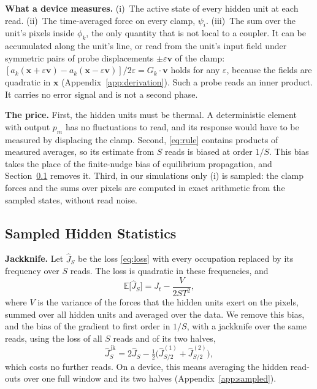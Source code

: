 \documentclass{article}
\newcommand{\x}{\bm{x}}
\begin{document}
\textbf{What a device measures.}
(i)~The active state of every hidden unit at each read.
(ii)~The time-averaged force on every clamp, $\psi_i$.
(iii)~The sum over the unit's pixels inside $\phi_k$, the only quantity that
is not local to a coupler. It can be accumulated along the unit's line, or
read from the unit's input field under symmetric pairs of probe displacements
$\pm\varepsilon\bm{v}$ of the clamp:
$[a_k(\x+\varepsilon\bm{v})-a_k(\x-\varepsilon\bm{v})]/2\varepsilon
=G_k\!\cdot\!\bm{v}$
holds for any $\varepsilon$, because the fields are quadratic in $\x$
(Appendix~\ref{app:derivation}). Such a probe reads an inner product. It
carries no error signal and is not a second phase.

\textbf{The price.}
First, the hidden units must be thermal. A deterministic element with output
$p_m$ has no fluctuations to read, and its response would have to be measured
by displacing the clamp. Second, \eqref{eq:rule} contains products of
measured averages, so its estimate from $S$ reads is biased at order $1/S$.
This bias takes the place of the finite-nudge bias of equilibrium propagation,
and Section~\ref{sec:sampled} removes it. Third, in our simulations only (i)
is sampled: the clamp forces and the sums over pixels are computed in exact
arithmetic from the sampled states, without read noise.

\subsection{Sampled Hidden Statistics}
\label{sec:sampled}

\textbf{Jackknife.}
Let $\hat J_S$ be the loss \eqref{eq:loss} with every occupation replaced by
its frequency over $S$ reads. The loss is quadratic in these frequencies, and
\begin{equation}
  \mathbb{E}\bigl[\hat J_S\bigr] = J_t - \frac{V}{2ST^{2}} ,
  \label{eq:bias}
\end{equation}
where $V$ is the variance of the forces that the hidden units exert on the
pixels, summed over all hidden units and averaged over the data. We remove
this bias, and the bias of the gradient to first order in $1/S$, with a
jackknife over the same reads, using the loss of all $S$ reads and of its two
halves,
\begin{equation}
  \hat J^{\,\mathrm{jk}}_S = 2\hat J_S
    -\tfrac12\bigl(\hat J^{(1)}_{S/2}+\hat J^{(2)}_{S/2}\bigr) ,
  \label{eq:jackknife}
\end{equation}
which costs no further reads. On a device, this means averaging the hidden
read-outs over one full window and its two halves
(Appendix~\ref{app:sampled}).
\end{document}
